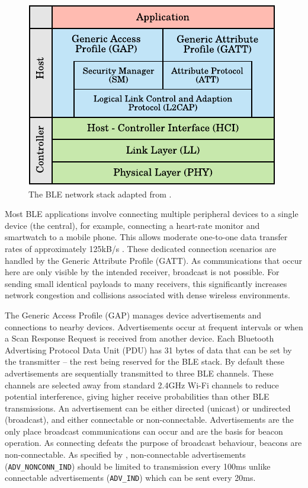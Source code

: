 \documentclass[conference]{IEEEtran} %
\begin{document}
\begin{figure}[H]
    \centering
   	\includegraphics[scale=0.75]{Figures/bt_stack}
    \caption[Bluetooth network stack]{
  The BLE network stack adapted from \cite{BT:LE_OVERVIEW}. 
    }
    \label{fig:bt_stack}
\end{figure}

Most BLE applications involve connecting multiple peripheral devices to a single device (the central), for example, connecting a heart-rate monitor and smartwatch to a mobile phone. This allows moderate one-to-one data transfer rates of approximately 125kB/s \cite{BT:LE_OVERVIEW}. These dedicated connection scenarios are handled by the Generic Attribute Profile (GATT). As communications that occur here are only visible by the intended receiver, broadcast is not possible. For sending small identical payloads to many receivers, this significantly increases network congestion and collisions associated with dense wireless environments. 

The Generic Access Profile (GAP) manages device advertisements and connections to nearby devices. Advertisements occur at frequent intervals or when a Scan Response Request is received from another device. Each Bluetooth Advertising Protocol Data Unit (PDU) has 31 bytes of data that can be set by the transmitter -- the rest being reserved for the BLE stack. By default these advertisements are sequentially transmitted to three BLE channels. These channels are selected away from standard 2.4GHz Wi-Fi channels to reduce potential interference, giving higher receive probabilities than other BLE transmissions. An advertisement can be either directed (unicast) or undirected (broadcast), and either connectable or non-connectable. Advertisements are the only place broadcast communications can occur and are the basis for beacon operation. As connecting defeats the purpose of broadcast behaviour, beacons are non-connectable. As specified by \cite{BT:CORE_SPEC}, non-connectable advertisements (\texttt{ADV\_NONCONN\_IND}) should be limited to transmission every 100ms unlike connectable advertisements (\texttt{ADV\_IND}) which can be sent every 20ms.
\end{document}
